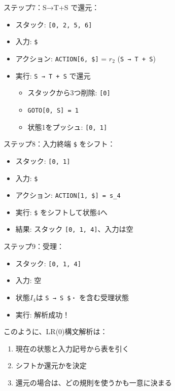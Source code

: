ステップ7：S→T+S で還元：

\begin{itemize}
\tightlist
\item
  スタック: \texttt{{[}0,\ 2,\ 5,\ 6{]}}
\item
  入力: \texttt{\$}
\item
  アクション: \texttt{ACTION{[}6,\ \${]}} = \(r_2\)
  (\texttt{S\ →\ T\ +\ S})
\item
  実行: \texttt{S\ →\ T\ +\ S} で還元

  \begin{itemize}
  \tightlist
  \item
    スタックから3つ削除: \texttt{{[}0{]}}
  \item
    \texttt{GOTO{[}0,\ S{]}\ =\ 1}
  \item
    状態1をプッシュ: \texttt{{[}0,\ 1{]}}
  \end{itemize}
\end{itemize}

ステップ8：入力終端 \texttt{\$} をシフト：

\begin{itemize}
\tightlist
\item
  スタック: \texttt{{[}0,\ 1{]}}
\item
  入力: \texttt{\$}
\item
  アクション: \texttt{ACTION{[}1,\ \${]}\ =\ s\_4}
\item
  実行: \texttt{\$} をシフトして状態4へ
\item
  結果: スタック \texttt{{[}0,\ 1,\ 4{]}}、入力は空
\end{itemize}

ステップ9：受理：

\begin{itemize}
\tightlist
\item
  スタック: \texttt{{[}0,\ 1,\ 4{]}}
\item
  入力: 空
\item
  状態\(I_4\)は \texttt{S\textquotesingle{}\ →\ S\ \$・} を含む受理状態
\item
  実行: 解析成功！
\end{itemize}

このように、LR(0)構文解析は：

\begin{enumerate}
\def\labelenumi{\arabic{enumi}.}
\tightlist
\item
  現在の状態と入力記号から表を引く
\item
  シフトか還元かを決定
\item
  還元の場合は、どの規則を使うかも一意に決まる
\end{enumerate}

